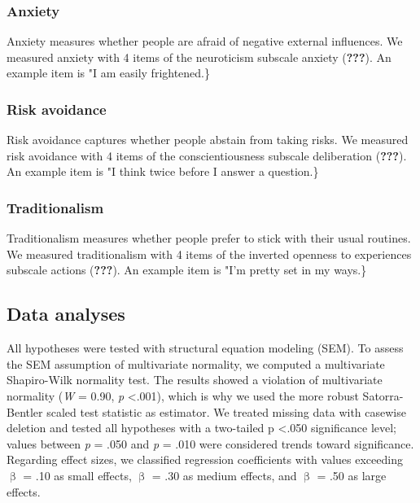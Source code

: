 \documentclass[man]{apa6}
\theoremstyle{definition}
\theoremstyle{definition}
\theoremstyle{definition}
\theoremstyle{remark}
\begin{document}
\hypertarget{anxiety-1}{%
\subsubsection{Anxiety}\label{anxiety-1}}

Anxiety measures whether people are afraid of negative external
influences. We measured anxiety with 4 items of the neuroticism subscale
anxiety ({\textbf{???}}). An example item is "I am easily frightened.\}

\hypertarget{risk-avoidance}{%
\subsubsection{Risk avoidance}\label{risk-avoidance}}

Risk avoidance captures whether people abstain from taking risks. We
measured risk avoidance with 4 items of the conscientiousness subscale
deliberation ({\textbf{???}}). An example item is "I think twice before
I answer a question.\}

\hypertarget{traditionalism}{%
\subsubsection{Traditionalism}\label{traditionalism}}

Traditionalism measures whether people prefer to stick with their usual
routines. We measured traditionalism with 4 items of the inverted
openness to experiences subscale actions ({\textbf{???}}). An example
item is "I'm pretty set in my ways.\}

\hypertarget{data-analyses}{%
\subsection{Data analyses}\label{data-analyses}}

All hypotheses were tested with structural equation modeling (SEM). To
assess the SEM assumption of multivariate normality, we computed a
multivariate Shapiro-Wilk normality test. The results showed a violation
of multivariate normality (\emph{W} = 0.90, \emph{p} \textless .001),
which is why we used the more robust Satorra-Bentler scaled test
statistic as estimator. We treated missing data with casewise deletion
and tested all hypotheses with a two-tailed p \textless .050
significance level; values between \emph{p} = .050 and \emph{p} = .010
were considered trends toward significance. Regarding effect sizes, we
classified regression coefficients with values exceeding \(\upbeta\) =
.10 as small effects, \(\upbeta\) = .30 as medium effects, and
\(\upbeta\) = .50 as large effects.
\end{document}
